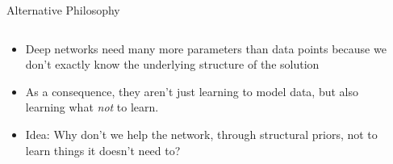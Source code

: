 \documentclass[t,xcolor=dvipsnames]{beamer}
\begin{document}
\begin{frame}{Alternative Philosophy}
\begin{columns}[onlytextwidth,T]
\begin{column}{0.65\textwidth}
\begin{itemize}
    \item Deep networks need many more parameters than data points because we don't exactly know the underlying structure of the solution
    \item As a consequence, they aren't just learning to model data, but also learning what \emph{\color{blue}not} to learn. 
    \item Idea: Why don't we help the network, through structural priors, not to learn things it doesn't need to?
\end{itemize}
\end{column}
\begin{column}{0.34\textwidth}

\end{column}
\end{columns}
\end{frame}
\end{document}
